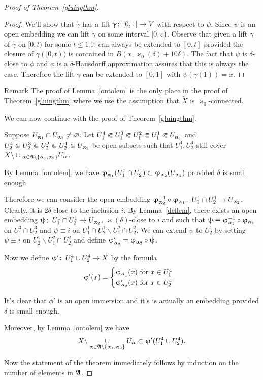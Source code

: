 \begin{proof}[Proof of Theorem~\ref{gluingthm}]
\begin{proof}
We'll  show that $\tilde{\gamma}$  has a lift $\gamma\co [0,1]\to V$ with respect to $\psi$. Since $\psi $ is an open embedding we can lift $\tilde{\gamma}$ on some interval $[0,\upvarepsilon)$. Observe that given a lift $\gamma$  of $\tilde{\gamma}$  on $[0,t)$ for some $t\le 1$  it can always be extended to $[0,t]$ provided the closure of $\gamma([0,t))$ is contained in $B(x,\varkappa_0(\delta)+10\delta)$. The fact that $\psi$ is $\delta$-close to $\phi$ and $\phi$ is a $\delta$-Hausdorff approximation assures that this is always the case. Therefore the lift $\gamma$ can be extended to $[0,1]$ with $\psi(\gamma(1))=\tilde{x}$.
\end{proof}

\begin{thm}{Remark}
The proof of Lemma~\ref{ontolem} is the only place in the proof of Theorem~\ref{gluingthm} where we use the assumption that $\tilde{X}$ is $\varkappa_0$-connected.
\end{thm}


We can now continue with the proof of Theorem~\ref{gluingthm}.

Suppose $U_{\a_1}\cap U_{\a_2}\ne \emptyset$. Let $U_1^4\Subset U_1^3\Subset U_1^2\Subset U_1^1\Subset U_{\upalpha_1}$ and 
$U_2^4\Subset U_2^3\Subset U_2^2\Subset U_2^1\Subset U_{\upalpha_2}$ be open subsets such that $U_1^4, U_2^4$ still cover
$X\backslash \cup_{\a\in \frak A\backslash\{\a_1,\a_2\}}U_\a$.

By Lemma~\ref{ontolem},  we have $\phi_{\a_1}(U_1^1\cap U_2^1)\subset \phi_{\a_2}(U_{\a_2})$ provided $\delta$ is small enough.

Therefore we can consider the open embedding $\phi_{\a_2}^{-1}\circ \phi_{\a_1}\co U_1^1\cap U_2^1\to U_{\a_2}$. Clearly, it is $2\delta$-close to the inclusion $i$. By Lemma~\ref{deflem}, there exists an open embedding $\psi\co U_1^1\cap U_2^1\to U_{\a_2}$, $\varkappa(\delta)$-close to $i$ and such that $\psi\equiv \phi_{\a_2}^{-1}\circ \phi_{\a_1}$ on $U_1^3\cap U_2^3$ and $\psi\equiv i$ on $U_1^1\cap U_2^1\backslash U_1^2\cap U_2^2$. We can extend $\psi$ to $U_2^1$ by setting $\psi\equiv i$ on $U_2^1 \backslash  U_1^2\cap U_2^2$ and define $\phi_{\a_2}'=\phi_{\a_2}\circ\psi$.

Now we define $\phi'\co U_1^4\cup U_2^4\to\tilde{X}$ by the formula
\[
\phi'(x)=
\begin{cases}
\phi_{\a_1}(x) \text{ for } x\in U_1^4\\
\phi_{\a_2}'(x) \text{ for } x\in U_2^4
\end{cases}
\]

It's clear that $\phi'$ is an open immersion and it's is actually an embedding provided $\delta$ is small enough.

Moreover, by Lemma~\ref{ontolem} we have 
\[\tilde{X}\backslash \underset{\a\in \frak A\backslash\{\a_1,\a_2\}}  { \cup}\tilde{U}_\a\subset \phi'(U_1^4\cup U_2^4).\]

 Now the statement of the theorem immediately follows by induction on the number of elements in $\frak A$.


\end{proof}


